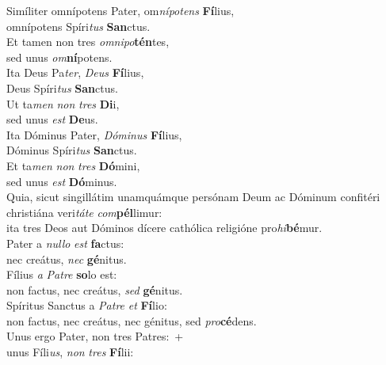 \oddverse Simíliter omnípotens Pater, om\textit{ní}\textit{po}\textit{tens} \textbf{Fí}lius,~\*\\
\oddverse omnípotens Spíri\textit{tus} \textbf{San}ctus.\\
\evenverse Et tamen non tres \textit{om}\textit{ni}\textit{po}\textbf{tén}tes,~\*\\
\evenverse sed unus \textit{om}\textbf{ní}potens.\\
\oddverse Ita Deus Pa\textit{ter}, \textit{De}\textit{us} \textbf{Fí}lius,~\*\\
\oddverse Deus Spíri\textit{tus} \textbf{San}ctus.\\
\evenverse Ut ta\textit{men} \textit{non} \textit{tres} \textbf{Di}i,~\*\\
\evenverse sed unus \textit{est} \textbf{De}us.\\
\oddverse Ita Dóminus Pater, \textit{Dó}\textit{mi}\textit{nus} \textbf{Fí}lius,~\*\\
\oddverse Dóminus Spíri\textit{tus} \textbf{San}ctus.\\
\evenverse Et ta\textit{men} \textit{non} \textit{tres} \textbf{Dó}mini,~\*\\
\evenverse sed unus \textit{est} \textbf{Dó}minus.\\
\oddverse Quia, sicut singillátim unamquámque persónam Deum ac Dóminum confitéri christiána veri\textit{tá}\textit{te} \textit{com}\textbf{pél}limur:~\*\\
\oddverse ita tres Deos aut Dóminos dícere cathólica religióne pro\textit{hi}\textbf{bé}mur.\\
\evenverse Pater a \textit{nul}\textit{lo} \textit{est} \textbf{fa}ctus:~\*\\
\evenverse nec creátus, \textit{nec} \textbf{gé}nitus.\\
\oddverse Fílius \textit{a} \textit{Pa}\textit{tre} \textbf{so}lo est:~\*\\
\oddverse non factus, nec creátus, \textit{sed} \textbf{gé}nitus.\\
\evenverse Spíritus Sanctus a \textit{Pa}\textit{tre} \textit{et} \textbf{Fí}lio:~\*\\
\evenverse non factus, nec creátus, nec génitus, sed \textit{pro}\textbf{cé}dens.\\
\oddverse Unus ergo Pater, non tres Patres:~+\\
\oddverse  unus Fíli\textit{us}, \textit{non} \textit{tres} \textbf{Fí}lii:~\*\\
